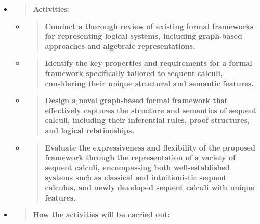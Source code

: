 \begin{itemize}
\item
  \begin{quote}
  \textbf{Activities:\\
  }
  \end{quote}

  \begin{itemize}
  \item
    \begin{quote}
    \textbf{Conduct a thorough review of existing formal frameworks for
    representing logical systems, including graph-based approaches and
    algebraic representations.}
    \end{quote}
  \item
    \begin{quote}
    \textbf{Identify the key properties and requirements for a formal
    framework specifically tailored to sequent calculi, considering
    their unique structural and semantic features.}
    \end{quote}
  \item
    \begin{quote}
    \textbf{Design a novel graph-based formal framework that effectively
    captures the structure and semantics of sequent calculi, including
    their inferential rules, proof structures, and logical
    relationships.}
    \end{quote}
  \item
    \begin{quote}
    \textbf{Evaluate the expressiveness and flexibility of the proposed
    framework through the representation of a variety of sequent
    calculi, encompassing both well-established systems such as
    classical and intuitionistic sequent calculus, and newly developed
    sequent calculi with unique features.}
    \end{quote}
  \end{itemize}
\item
  \begin{quote}
  \textbf{How the activities will be carried out:\\
  }
  \end{quote}


\end{itemize}
